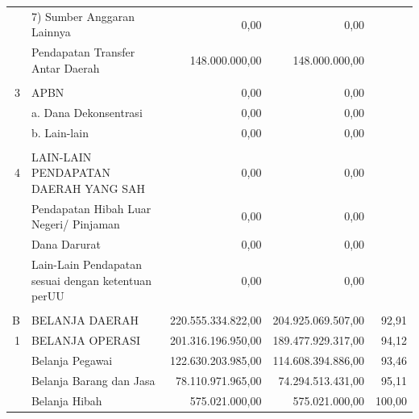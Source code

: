 \begin{longtable}{rY{30em}rrr}
	      & 7) Sumber Anggaran Lainnya                         &               0,00 &               0,00 &        \\
	      & Pendapatan Transfer Antar Daerah                   &     148.000.000,00 &     148.000.000,00 &        \\
	      &                                                    &                    &                    &        \\
	    3 & APBN                                               &               0,00 &               0,00 &        \\
	      & a. Dana Dekonsentrasi                              &               0,00 &               0,00 &        \\
	      & b. Lain-lain                                       &               0,00 &               0,00 &        \\
	      &                                                    &                    &                    &        \\
	    4 & LAIN-LAIN PENDAPATAN DAERAH YANG SAH               &               0,00 &               0,00 &        \\
	      & Pendapatan Hibah Luar Negeri/ Pinjaman             &               0,00 &               0,00 &        \\
	      & Dana Darurat                                       &               0,00 &               0,00 &        \\
	      & Lain-Lain Pendapatan sesuai dengan ketentuan perUU &               0,00 &               0,00 &        \\
	      &                                                    &                    &                    &        \\
	    B & BELANJA DAERAH                                     & 220.555.334.822,00 & 204.925.069.507,00 &  92,91 \\
	    1 & BELANJA OPERASI                                    & 201.316.196.950,00 & 189.477.929.317,00 &  94,12 \\
	      & Belanja Pegawai                                    & 122.630.203.985,00 & 114.608.394.886,00 &  93,46 \\
	      & Belanja Barang dan Jasa                            &  78.110.971.965,00 &  74.294.513.431,00 &  95,11 \\
	      & Belanja Hibah                                      &     575.021.000,00 &     575.021.000,00 & 100,00 \\

\end{longtable}
